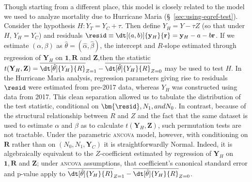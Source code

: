Though starting from a different place, this model is closely related
to the model we used to analyze mortality due to Hurricane Maria
(\S~\ref{sec:using-eqref-test}).
Consider the hypothesis $H: Y_{T} = Y_{C} + \tau$.
Then define ${{Y}_H} = {Y} - \tau {Z}$ (so that under $H$, $Y_H=Y_C$)
and residuals $\resid\equiv\dt[(a, b)]{\mathbf{y}_{H}}{ \mathbf{r}} = {\mathbf{y}_H} - a -
b\mathbf{r}$.
If we estimate $(\alpha,\beta)$ as  $\hat\theta = (\hat\alpha, \hat\beta)$, the intercept and $R$-slope
estimated through regression of ${\mathbf{Y}_H}$ on
$\mathbf{1}, \mathbf{R}$ and $\mathbf{Z}$,then
the statistic
$t(\mathbf{Y}_H , \mathbf{Z}) =
\overline{\dt[\hat\theta]{{{Y}_H}}{ {R}}}_{Z=1} -
\overline{\dt[\hat\theta]{{{Y}_H}}{ {R}}}_{Z=0}$
may be used to test $H$.
In the Hurricane Maria analysis, regression parameters giving rise to
residuals $\resid$ were estimated from pre-2017 data, whereas $Y_H$
was constructed using data from 2017.
This clean separation allowed us to tabulate the distribution of the
test statistic, conditional on $\bm{\resid},N_1, and N_0$.
In contrast, because of the structural relationship
between $R$ and $Z$ and the fact that the same dataset is used to
estimate $\alpha$ and $\beta$ as to calculate
$t(\mathbf{Y}_H,\mathbf{Z})$, such permutation tests are not tractable.
Under the parametric \textsc{ancova} model, however, with
conditioning on $\mathbf{R}$ rather than on $(N_{0}, N_{1},
\mathbf{Y}_{C})$ %
it is straightforwardly Normal. Indeed, it is
algebraically equivalent to the $Z$-coefficient estimated by
regression of ${\mathbf{Y}_H}$ on $\mathbf{1}, \mathbf{R}$ and
$\mathbf{Z}$; under \textsc{ancova} assumptions, that coefficient's
canonical standard error and p-value apply to
$\overline{\dt[\hat\theta]{{{Y}_H}}{ {R}}}_{Z=1} -
\overline{\dt[\hat\theta]{{{Y}_H}}{ {R}}}_{Z=0}$.


